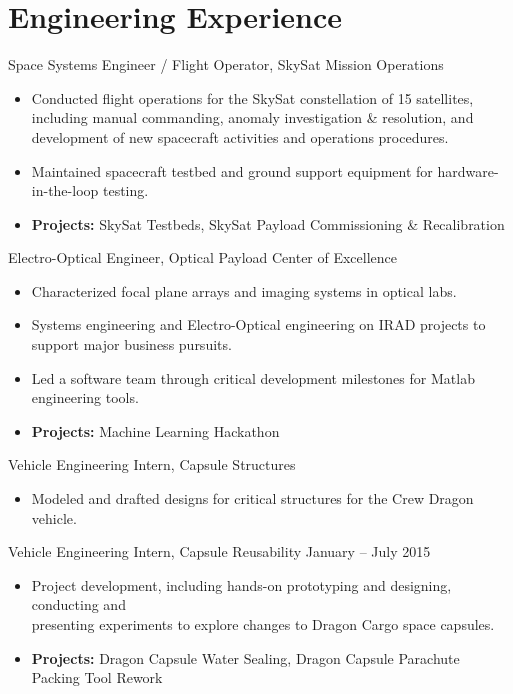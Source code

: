 \documentclass[10pt,final,sans]{resume}
\begin{document}
\section{Engineering Experience}

Space Systems Engineer / Flight Operator, SkySat Mission Operations
\begin{itemize}
  \item Conducted flight operations for the SkySat constellation of 15
  satellites, including manual commanding, anomaly investigation \& resolution,
  and development of new spacecraft activities and operations procedures. 
  \item Maintained spacecraft testbed and ground support equipment for
  hardware-in-the-loop testing.
  \item {\bf Projects:} SkySat Testbeds, SkySat Payload Commissioning \&
  Recalibration
\end{itemize}

Electro-Optical Engineer, Optical Payload Center of Excellence
\begin{itemize}
  \item Characterized focal plane arrays and imaging systems in optical labs.
  \item Systems engineering and Electro-Optical engineering on IRAD projects to
  support major business pursuits.
  \item Led a software team through critical development milestones for Matlab
  engineering tools. 
  \item {\bf Projects:} Machine Learning Hackathon
\end{itemize} 
Vehicle Engineering Intern, Capsule Structures
\begin{itemize}
  \item Modeled and drafted designs for critical structures for the Crew Dragon
  vehicle.
\end{itemize}

Vehicle Engineering Intern, Capsule Reusability \hfill January -- July 2015
\begin{itemize}
  \item Project development, including hands-on prototyping and designing,
  conducting and \\
  presenting experiments to explore changes to Dragon Cargo space capsules.
  \item {\bf Projects:} Dragon Capsule Water Sealing, Dragon Capsule Parachute
  Packing Tool Rework
\end{itemize}
\end{document}
